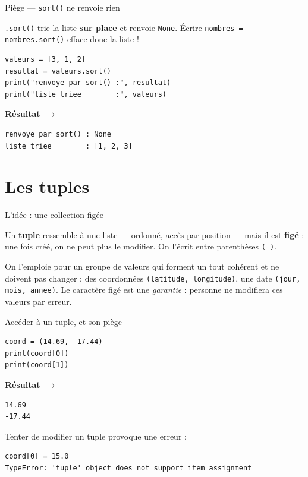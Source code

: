 \documentclass[aspectratio=169,11pt]{beamer}
\newcommand{\resultat}{{\scriptsize\textbf{R\'esultat}~$\rightarrow$}\par\vspace{1pt}}
\begin{document}
\begin{frame}[fragile]{Piège — \texttt{sort()} ne renvoie rien}
\begin{ucadpiege}
{\small \texttt{.sort()} trie la liste \textbf{sur place} et renvoie \texttt{None}. Écrire \texttt{nombres = nombres.sort()} efface donc la liste !}
\end{ucadpiege}
\begin{lstlisting}
valeurs = [3, 1, 2]
resultat = valeurs.sort()
print("renvoye par sort() :", resultat)
print("liste triee        :", valeurs)
\end{lstlisting}
\resultat
\begin{lstlisting}[style=out]
renvoye par sort() : None
liste triee        : [1, 2, 3]
\end{lstlisting}
\end{frame}

\section{Les tuples}

\begin{frame}{L'idée : une collection figée}
\begin{ucaddef}
{\small Un \textbf{tuple} ressemble à une liste — ordonné, accès par position — mais il est \textbf{figé} : une fois créé, on ne peut plus le modifier. On l'écrit entre parenthèses \texttt{( )}.}
\end{ucaddef}
{\small On l'emploie pour un groupe de valeurs qui forment un tout cohérent et ne doivent pas changer : des coordonnées \texttt{(latitude, longitude)}, une date \texttt{(jour, mois, annee)}. Le caractère figé est une \emph{garantie} : personne ne modifiera ces valeurs par erreur.}
\end{frame}

\begin{frame}[fragile]{Accéder à un tuple, et son piège}
\begin{lstlisting}
coord = (14.69, -17.44)
print(coord[0])
print(coord[1])
\end{lstlisting}
\resultat
\begin{lstlisting}[style=out]
14.69
-17.44
\end{lstlisting}
{\small Tenter de modifier un tuple provoque une erreur :}
\begin{lstlisting}[style=err]
coord[0] = 15.0
TypeError: 'tuple' object does not support item assignment
\end{lstlisting}
\end{frame}
\end{document}
